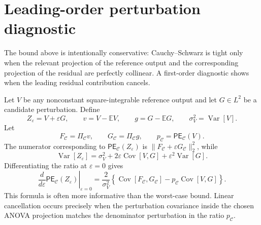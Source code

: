 \documentclass[11pt,letterpaper]{article}
\DeclareMathOperator{\Var}{Var}
\DeclareMathOperator{\Cov}{Cov}
\newcommand{\E}{\mathbb{E}}
\theoremstyle{remark}
\begin{document}
\section{Leading-order perturbation diagnostic}
\label{sec:perturbation}

The bound above is intentionally conservative: Cauchy--Schwarz is tight only
when the relevant projection of the reference output and the corresponding
projection of the residual are perfectly collinear. A first-order diagnostic
shows when the leading residual contribution cancels.

Let $V$ be any nonconstant square-integrable reference output and let
$G\in L^2$ be a candidate perturbation. Define
\begin{equation}
  Z_\varepsilon=V+\varepsilon G,
  \qquad
  v=V-\E V,
  \qquad
  g=G-\E G,
  \qquad
  \sigma_V^2=\Var[V].
\end{equation}
Let
\begin{equation}
  F_{\mathscr C}=\Pi_{\mathscr C}v,
  \qquad
  G_{\mathscr C}=\Pi_{\mathscr C}g,
  \qquad
  p_{\mathscr C}=\mathsf{PE}_{\mathscr C}(V).
\end{equation}
The numerator corresponding to $\mathsf{PE}_{\mathscr C}(Z_\varepsilon)$ is
$\|F_{\mathscr C}+\varepsilon G_{\mathscr C}\|_2^2$, while
\begin{equation}
  \Var[Z_\varepsilon]
  =\sigma_V^2+2\varepsilon\Cov[V,G]+\varepsilon^2\Var[G].
\end{equation}
Differentiating the ratio at $\varepsilon=0$ gives
\begin{equation}
  \left.\frac{d}{d\varepsilon}\mathsf{PE}_{\mathscr C}(Z_\varepsilon)\right|_{\varepsilon=0}
  =\frac{2}{\sigma_V^2}
  \left\{\Cov[F_{\mathscr C},G_{\mathscr C}]
         -p_{\mathscr C}\Cov[V,G]\right\}.
  \label{eq:directional_derivative_general}
\end{equation}
This formula is often more informative than the worst-case bound. Linear
cancellation occurs precisely when the perturbation covariance inside the chosen
ANOVA projection matches the denominator perturbation in the ratio
$p_{\mathscr C}$.
\end{document}
